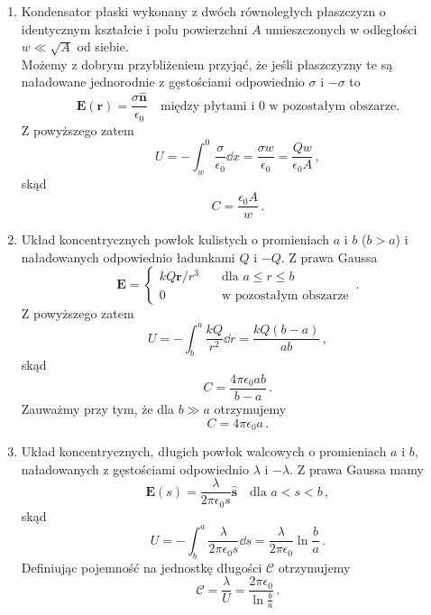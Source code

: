 \documentclass[../main.tex]{subfiles}
\begin{document}
\begin{enumerate}
    \item Kondensator płaski wykonany z dwóch równoległych płaszczyzn o identycznym kształcie i polu
    powierzchni \(A\) umieszczonych w odległości \(w\ll\sqrt{A}\) od siebie.\\
    Możemy z dobrym przybliżeniem przyjąć, że jeśli płaszczyzny te są naładowane jednorodnie z
    gęstościami odpowiednio \(\sigma\) i \(-\sigma\) to
    \begin{equation*}
        \mathbf{E}(\mathbf{r})=\frac{\sigma \mathbf{\hat{n}}}{\epsilon_0}\quad\text{między płytami i 0 w pozostałym obszarze.}
    \end{equation*}
    Z powyższego zatem
    \begin{equation*}
        U=-\int_w^0\frac{\sigma }{\epsilon_0}\dd{x}=\frac{\sigma w}{\epsilon_0}=\frac{Qw}{\epsilon_0A}\,,
    \end{equation*}
    skąd
    \begin{equation*}
        C=\frac{\epsilon_0 A}{w}\,.
    \end{equation*}
    \item Układ koncentrycznych powłok kulistych o promieniach \(a\) i \(b\) (\(b>a\)) i
    naładowanych odpowiednio ładunkami \(Q\) i \(-Q\). Z prawa Gaussa
    \begin{equation*}
        \mathbf{E}=\begin{cases}
        kQ\mathbf{r}/r^3\quad&\text{dla \(a\leq r\leq b\)}\\
        0\quad&\text{w pozostałym obszarze}
        \end{cases}\,.
    \end{equation*}
    Z powyższego zatem
    \begin{equation*}
        U=-\int_b^a\frac{kQ}{r^2}\dd{r}=\frac{kQ(b-a)}{ab}\,,
    \end{equation*}
    skąd
    \begin{equation*}
        C=\frac{4\pi\epsilon_0ab}{b-a}\,.
    \end{equation*}
    Zauważmy przy tym, że dla \(b\gg a\) otrzymujemy
    \begin{equation*}
        C=4\pi\epsilon_0a\,.
    \end{equation*}
    \item Układ koncentrycznych, długich powłok walcowych o promieniach \(a\) i \(b\), naładowanych
    z gęstościami odpowiednio \(\lambda\) i \(-\lambda\). Z prawa Gaussa mamy
    \begin{equation*}
        \mathbf{E}(s)=\frac{\lambda}{2\pi\epsilon_0 s}\mathbf{\hat{s}}\quad\text{dla \(a<s<b\)}\,,
    \end{equation*}
    skąd
    \begin{equation*}
        U=-\int_b^a\frac{\lambda}{2\pi\epsilon_0s}\dd{s}=\frac{\lambda}{2\pi\epsilon_0}\ln\frac{b}{a}\,.
    \end{equation*}
    Definiując pojemność na jednostkę długości \(\mathcal{C}\) otrzymujemy
    \begin{equation*}
        \mathcal{C}=\frac{\lambda}{U}=\frac{2\pi\epsilon_0}{\ln\frac{b}{a}}\,.
    \end{equation*}
\end{enumerate}
\end{document}
